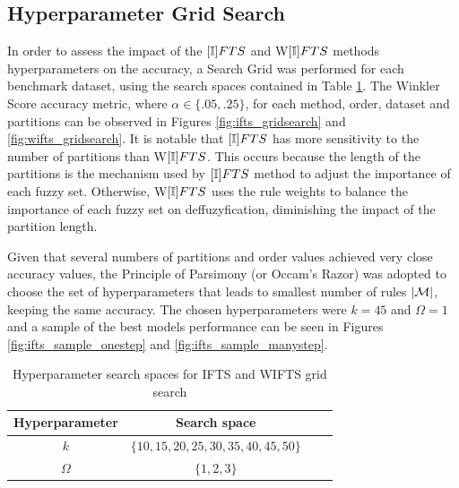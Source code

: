 %
\subsection{Hyperparameter Grid Search}
\label{sec:prob_hyperparameters}

In order to assess the impact of the $[\mathbb{I}]FTS$ and W$[\mathbb{I}]FTS$ methods hyperparameters on the accuracy, a Search Grid was performed for each benchmark dataset, using the search spaces contained in Table \ref{tab:ifts_gridsearch}. The Winkler Score accuracy metric, where  $\alpha \in \{.05,.25\}$, for each method, order, dataset and partitions can be observed in Figures \ref{fig:ifts_gridsearch} and \ref{fig:wifts_gridsearch}. It is notable that $[\mathbb{I}]FTS$ has more sensitivity to the number of partitions than W$[\mathbb{I}]FTS$. This occurs because the length of the partitions is the mechanism used by $[\mathbb{I}]FTS$ method to adjust the importance of each fuzzy set. Otherwise, W$[\mathbb{I}]FTS$ uses the rule weights to balance the importance of each fuzzy set on deffuzyfication, diminishing the impact of the partition length.   

Given that several numbers of partitions and order values achieved very close accuracy values, the Principle of Parsimony (or Occam's Razor) was adopted to choose the set of hyperparameters that leads to smallest number of rules $|\mathcal{M}|$, keeping the same accuracy. The chosen hyperparameters were $k = 45$ and $\Omega = 1$ and a sample of the best models performance can be seen in Figures \ref{fig:ifts_sample_onestep} and \ref{fig:ifts_sample_manystep}.

\begin{table}[htb]
    \centering
    \begin{tabular}{|c|c|c|c|} \hline
        Hyperparameter & Search space  \\ \hline
        $k$ & $\{10, 15, 20, 25, 30, 35, 40, 45, 50\}$  \\ \hline
        $\Omega$ & $\{1, 2, 3\}$ \\ \hline
    \end{tabular}
    \caption{Hyperparameter search spaces for IFTS and WIFTS grid search}
    \label{tab:ifts_gridsearch}
\end{table}


